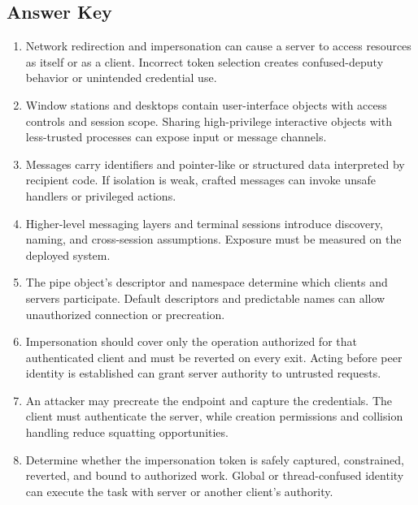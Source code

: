 \documentclass[11pt,letterpaper]{article}
\begin{document}
\subsection*{Answer Key}
\begin{enumerate}
\item Network redirection and impersonation can cause a server to access resources as itself or as a client. Incorrect token selection creates confused-deputy behavior or unintended credential use.
\item Window stations and desktops contain user-interface objects with access controls and session scope. Sharing high-privilege interactive objects with less-trusted processes can expose input or message channels.
\item Messages carry identifiers and pointer-like or structured data interpreted by recipient code. If isolation is weak, crafted messages can invoke unsafe handlers or privileged actions.
\item Higher-level messaging layers and terminal sessions introduce discovery, naming, and cross-session assumptions. Exposure must be measured on the deployed system.
\item The pipe object's descriptor and namespace determine which clients and servers participate. Default descriptors and predictable names can allow unauthorized connection or precreation.
\item Impersonation should cover only the operation authorized for that authenticated client and must be reverted on every exit. Acting before peer identity is established can grant server authority to untrusted requests.
\item An attacker may precreate the endpoint and capture the credentials. The client must authenticate the server, while creation permissions and collision handling reduce squatting opportunities.
\item Determine whether the impersonation token is safely captured, constrained, reverted, and bound to authorized work. Global or thread-confused identity can execute the task with server or another client's authority.
\end{enumerate}
\end{document}
